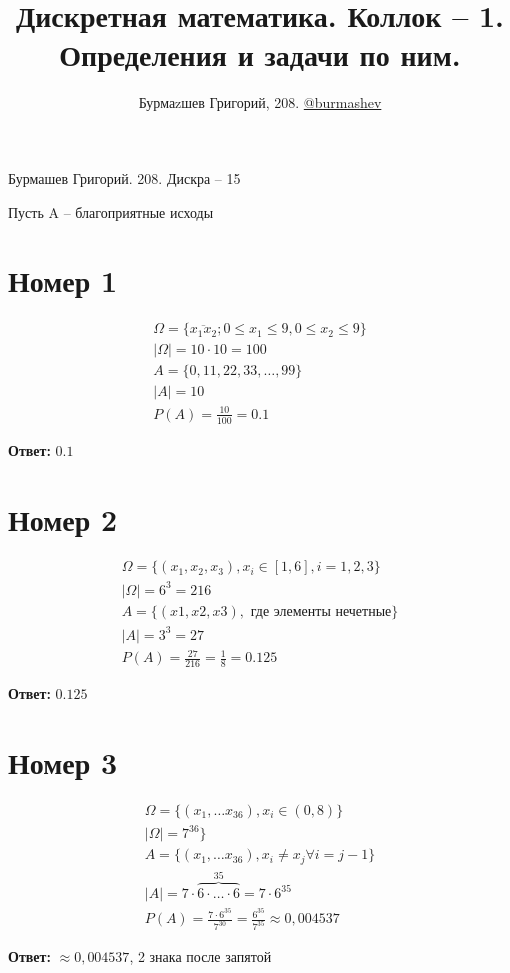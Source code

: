 \documentclass[a4paper,12pt]{article}
\author{Бурмаzшев Григорий, 208. \href{https://teleg.run/burmashev}{@burmashev}}
\title{Дискретная математика. Коллок -- 1. Определения и задачи по ним.}
\begin{document}
{\Large \begin{center}
Бурмашев Григорий.  208. Дискра -- 15
\end{center}}
Пусть A -- благоприятные исходы
\section*{Номер 1}
\begin{equation*}
\begin{gathered}
\Omega  = \{
\overline{x_1 x_2}; 0 \leq x_1 \leq 9, 0 \leq x_2 \leq 9
\}\\
|\Omega| = 10 \cdot 10 = 100 \\
A = \{0, 11, 22, 33, \ldots, 99 \} \\
|A| = 10 \\
P(A) = \frac{10}{100} = 0.1
\end{gathered}
\end{equation*}
\begin{center}
\textbf{Ответ: } $0.1$
\end{center}

\section*{Номер 2}
\begin{equation*}
\begin{gathered}
\Omega = \{
(x_1, x_2, x_3), x_i \in [1, 6], i = 1, 2, 3
\} \\
|\Omega| = 6^3 = 216
\\
A = \{ (x1, x2, x3), \text{ где элементы нечетные}\} \\
|A| = 3^3 = 27
\\
P(A) = \frac{27}{216} = \frac{1}{8} = 0.125
\end{gathered}
\end{equation*}

\begin{center}
\textbf{Ответ: } $0.125$
\end{center}
\section*{Номер 3}
\begin{equation*}
\begin{gathered}
\Omega = \{ 
(x_1, \ldots x_{36}), x_i \in (0, 8) 
\}
\\
|\Omega| = 7^{36}
\}
\\
A = \{ (x_1, \ldots x_{36}), x_i \neq x_j \forall i = j - 1
\} \\
|A| = 7 \cdot \overbrace{6 \cdot  \ldots \cdot 6}^{35} = 7 \cdot 6^{35}
\\
P(A) = \frac{7 \cdot 6^{35}}{7^{30}} = \frac{6^{35}}{7^{35}} \approx 0,004537
\end{gathered}
\end{equation*}
\begin{center}
\textbf{Ответ: } $\approx 0,004537$, 2 знака после запятой
\end{center}
\end{document}
